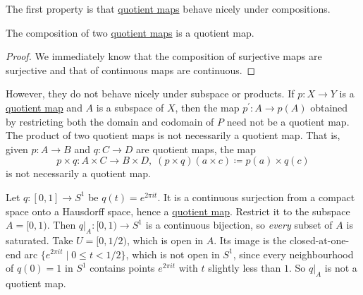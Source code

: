   The first property is that \hyperref[def:quotient-map]{quotient maps} behave nicely under compositions. 

  \begin{lemma}
    \label{thm:composition-of-quotient-maps}
    The composition of two \hyperref[def:quotient-map]{quotient maps} is a quotient map. 
  \end{lemma}
  \begin{proof}
    We immediately know that the composition of surjective maps are surjective and that of continuous maps are continuous. 
  \end{proof}

  However, they do not behave nicely under subspace or products. If $p: X \rightarrow Y$ is a \hyperref[def:quotient-map]{quotient map} and $A$ is a subspace of $X$, then the map $p^\prime: A \rightarrow p(A)$ obtained by restricting both the domain and codomain of $P$ need not be a quotient map. The product of two quotient maps is not necessarily a quotient map. That is, given $p: A \rightarrow B$ and $q: C \rightarrow D$ are quotient maps, the map 
  \begin{equation}
    p \times q: A \times C \rightarrow B \times D, \; (p \times q) (a \times c) \coloneqq p(a) \times q(c)
  \end{equation}
  is not necessarily a quotient map. 

  \begin{example}
    \label{ex:restriction-of-quotient-maps-are-not-quotient}
    Let $q: [0, 1] \to S^1$ be $q(t) = e^{2 \pi i t}$. It is a continuous surjection from a compact space onto a Hausdorff space, hence a \hyperref[def:quotient-map]{quotient map}. Restrict it to the subspace $A = [0, 1)$. Then $q |_A : [0,1) \to S^1$ is a continuous bijection, so \textit{every} subset of $A$ is saturated. Take $U = [0, 1/2)$, which is open in $A$. Its image is the closed-at-one-end arc $\{e^{2\pi i t} \mid 0 \leq t < 1/2\}$, which is not open in $S^1$, since every neighbourhood of $q(0) = 1$ in $S^1$ contains points $e^{2 \pi i t}$ with $t$ slightly less than $1$. So $q|_A$ is not a quotient map. 
  \end{example}

